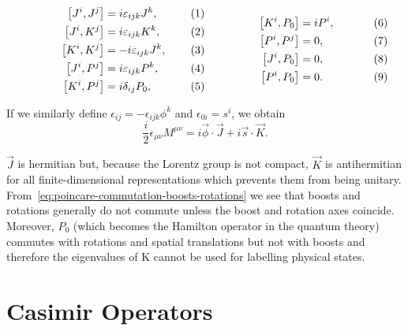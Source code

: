 \begin{subequations}
\label{eq:poincare-commutation-boosts-rotations}
\noindent\centering
    \begin{minipage}{0.48\textwidth}
        \begin{align}
        \comm{J^i}{J^j} &= i \epsilon_{ijk} J^k, \\
        \comm{J^i}{K^j} &= i \epsilon_{ijk} K^k ,\\
        \comm{K^i}{K^j} &= -i \epsilon_{ijk} J^k, \\
        \comm{J^i}{P^j} &= i \epsilon_{ijk} P^k ,\\
        \comm{K^i}{P^j} &= i \delta_{ij} P_0,
        \end{align}
    \end{minipage}
    \hfill
    \begin{minipage}{0.48\textwidth}
    \label{eq:bell_states}
        \begin{align}
        \comm{K^i}{P_0} &= i P^i ,\\
        \comm{P^i}{P^j} &= 0, \\
        \comm{J^i}{P_0} &= 0, \\
        \comm{P^i}{P_0} &= 0 .
        \end{align}
    \end{minipage}\bigskip
    \end{subequations}

If we similarly define $\epsilon_{ij} = - \epsilon_{ijk} \phi^k$ and $\epsilon_{0i} = s^i$, we obtain
\begin{equation}
    \frac{i}{2} \epsilon_{\mu\nu} M^{\mu\nu} = i \vec{\phi} \cdot \vec{J} + i \vec{s} \cdot \vec{K}.
\end{equation}

$\vec{J}$ is hermitian but, because the Lorentz group is not compact, $\vec{K}$ is antihermitian for all finite-dimensional representations which prevents them from being unitary. From~\eqref{eq:poincare-commutation-boosts-rotations} we see that boosts and rotations generally do not commute unless the boost and rotation axes coincide. Moreover, $P_0$ (which becomes the Hamilton operator in the quantum theory) commutes with rotations and spatial translations but not with boosts and therefore the eigenvalues of K cannot be used for labelling physical states.


\section{Casimir Operators}

